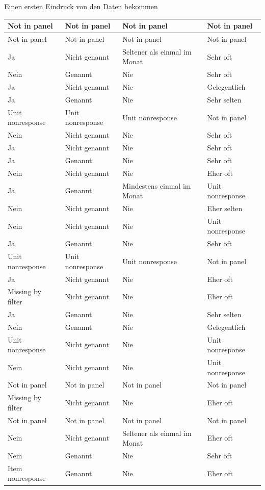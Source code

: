 \documentclass[ignorenonframetext,]{beamer}
\begin{document}
\begin{frame}{Einen ersten Eindruck von den Daten bekommen}
\begin{tabular}{l|l|l|l}
\hline
Not in panel & Not in panel & Not in panel & Not in panel\\
\hline
Not in panel & Not in panel & Not in panel & Not in panel\\
\hline
Ja & Nicht genannt & Seltener als einmal im Monat & Sehr oft\\
\hline
Nein & Genannt & Nie & Sehr oft\\
\hline
Ja & Nicht genannt & Nie & Gelegentlich\\
\hline
Ja & Genannt & Nie & Sehr selten\\
\hline
Unit nonresponse & Unit nonresponse & Unit nonresponse & Not in panel\\
\hline
Nein & Nicht genannt & Nie & Sehr oft\\
\hline
Ja & Nicht genannt & Nie & Sehr oft\\
\hline
Ja & Genannt & Nie & Sehr oft\\
\hline
Nein & Nicht genannt & Nie & Eher oft\\
\hline
Ja & Genannt & Mindestens einmal im Monat & Unit nonresponse\\
\hline
Nein & Nicht genannt & Nie & Eher selten\\
\hline
Nein & Nicht genannt & Nie & Unit nonresponse\\
\hline
Ja & Genannt & Nie & Sehr oft\\
\hline
Unit nonresponse & Unit nonresponse & Unit nonresponse & Not in panel\\
\hline
Ja & Nicht genannt & Nie & Eher oft\\
\hline
Missing by filter & Nicht genannt & Nie & Eher oft\\
\hline
Ja & Genannt & Nie & Sehr selten\\
\hline
Nein & Genannt & Nie & Gelegentlich\\
\hline
Unit nonresponse & Nicht genannt & Nie & Unit nonresponse\\
\hline
Nein & Nicht genannt & Nie & Unit nonresponse\\
\hline
Not in panel & Not in panel & Not in panel & Not in panel\\
\hline
Missing by filter & Nicht genannt & Nie & Eher oft\\
\hline
Not in panel & Not in panel & Not in panel & Not in panel\\
\hline
Nein & Nicht genannt & Seltener als einmal im Monat & Eher oft\\
\hline
Nein & Genannt & Nie & Sehr oft\\
\hline
Item nonresponse & Genannt & Nie & Eher oft\\

\end{tabular}
\end{frame}
\end{document}
